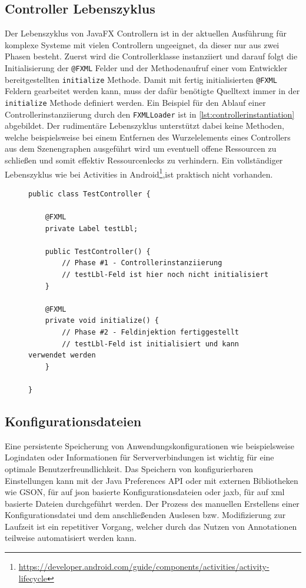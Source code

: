 \subsection{Controller Lebenszyklus}
\label{controller_lebenszyklus}
Der Lebenszyklus von JavaFX Controllern ist in der aktuellen Ausführung für komplexe Systeme mit vielen Controllern ungeeignet, da dieser nur aus zwei Phasen besteht. Zuerst wird die Controllerklasse instanziiert und darauf folgt die Initialisierung der \texttt{@FXML} Felder und der Methodenaufruf einer vom Entwickler bereitgestellten \texttt{initialize} Methode. Damit mit fertig initialisierten \texttt{@FXML} Feldern gearbeitet werden kann, muss der dafür benötigte Quelltext immer in der \texttt{initialize} Methode definiert werden. Ein Beispiel für den Ablauf einer Controllerinstanziierung durch den \texttt{FXMLLoader} ist in \autoref{lst:controllerinstantiation} abgebildet. Der rudimentäre Lebenszyklus unterstützt dabei keine Methoden, welche beispielsweise bei einem Entfernen des Wurzelelements eines Controllers aus dem Szenengraphen ausgeführt wird um eventuell offene Ressourcen zu schließen und somit effektiv Ressourcenlecks zu verhindern. Ein vollständiger Lebenszyklus wie bei Activities in Android\footnote{\url{https://developer.android.com/guide/components/activities/activity-lifecycle}},ist praktisch nicht vorhanden.
\begin{figure}[H]
	\centering
	\begin{lstlisting}[caption=Beispiel -- Instanziierungsablauf., captionpos=b, label=lst:controllerinstantiation]
public class TestController {
	
	@FXML
	private Label testLbl;
	
	public TestController() {
		// Phase #1 - Controllerinstanziierung
		// testLbl-Feld ist hier noch nicht initialisiert
	}
	
	@FXML
	private void initialize() {
		// Phase #2 - Feldinjektion fertiggestellt
		// testLbl-Feld ist initialisiert und kann verwendet werden
	}
	
}
	\end{lstlisting}
\end{figure}
\subsection{Konfigurationsdateien}
Eine persistente Speicherung von Anwendungskonfigurationen wie beispielsweise Logindaten oder Informationen für Serververbindungen ist wichtig für eine optimale Benutzerfreundlichkeit. Das Speichern von konfigurierbaren Einstellungen kann mit der Java Preferences API oder mit externen Bibliotheken wie GSON, für auf \ac{json} basierte Konfigurationsdateien oder \ac{jaxb}, für auf \ac{xml} basierte Dateien durchgeführt werden. Der Prozess des manuellen Erstellens einer Konfigurationsdatei und dem anschließenden Auslesen bzw. Modifizierung zur Laufzeit ist ein repetitiver Vorgang, welcher durch das Nutzen von Annotationen teilweise automatisiert werden kann.
